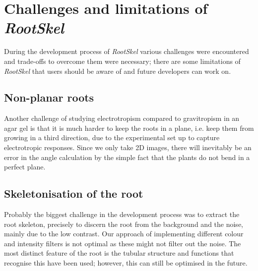 \section{Challenges and limitations of \textit{RootSkel}}

During the development process of \textit{RootSkel} various challenges were encountered and trade-offs to overcome them were necessary; there are some limitations of \textit{RootSkel} that users should be aware of and future developers can work on.


\subsection{Non-planar roots}

Another challenge of studying electrotropism compared to gravitropism in an agar gel is that it is much harder to keep the roots in a plane, i.e. keep them from growing in a third direction, due to the experimental set up to capture electrotropic responses. Since we only take 2D images, there will inevitably be an error in the angle calculation by the simple fact that the plants do not bend in a perfect plane.


\subsection{Skeletonisation of the root}

Probably the biggest challenge in the development process was to extract the root skeleton, precisely to discern the root from the background and the noise, mainly due to the low contrast. %
Our approach of implementing different colour and intensity filters is not optimal as these might not filter out the noise. 
The most distinct feature of the root is the tubular structure and functions that recognise this have been used; however, this can still be optimised in the future.

